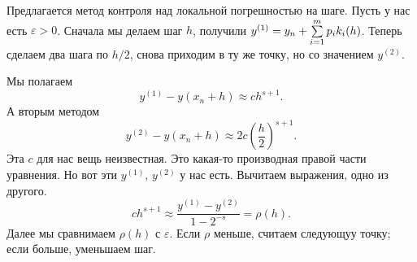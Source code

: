 Предлагается метод контроля над локальной погрешностью на шаге. Пусть у нас есть $\varepsilon>0$. Сначала мы делаем шаг $h$, получили $y^{(1)} = y_n + \sum\limits_{i = 1}^{m} p_i k_i(h)$. Теперь сделаем два шага по $h/2$, снова приходим в ту же точку, но со значением $y^{(2)}$.

Мы полагаем
\[
  y^{(1)} - y(x_n+h)\approx c h^{s+1}.
\]
А вторым методом
\[
  y^{(2)} - y(x_n+h)\approx 2c \left( \frac{h}{2} \right)^{s+1}.
\]
Эта $c$ для нас вещь неизвестная. Это какая-то производная правой части уравнения. Но вот эти $y^{(1)}$, $y^{(2)}$ у нас есть. Вычитаем выражения, одно из другого.
\[
  c h^{s+1}\approx \frac{ y^{(1)} - y^{(2)}}{1 - 2^{-s}} = \rho(h).
\]
Далее мы сравнимаем $\rho(h)$ с $\varepsilon$. Если $\rho$ меньше, считаем следующуу точку; если больше, уменьшаем шаг.
